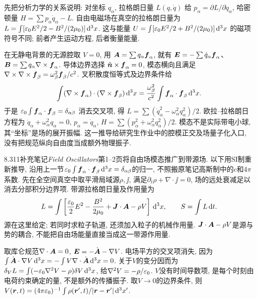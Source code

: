 先把分析力学的关系说明: 对坐标 $q_\alpha$, 拉格朗日量 $L(q,\dot q)$ 给 $p_\alpha=\partial L/\partial\dot q_\alpha$, 哈密顿量 $H=\sum p_\alpha\dot q_\alpha-L$. 自由电磁场在真空的拉格朗日量为
$L=\int[\varepsilon_0 E^2/2-B^2/(2\mu_0)]\,\mathrm d^3x$.
这与能量 $U=\int[\varepsilon_0 E^2/2+B^2/(2\mu_0)]\,\mathrm d^3x$ 的磁项符号不同; 前者产生运动方程, 后者衡量能量.

在无静电背景的无源腔取 $V=0$, 用 $\boldsymbol{A}=\sum q_\alpha\boldsymbol{f}_\alpha$, 就有 $\boldsymbol{E}=-\sum\dot q_\alpha\boldsymbol{f}_\alpha$、$\boldsymbol{B}=\sum q_\alpha\nabla\times\boldsymbol{f}_\alpha$. 导体边界选择 $\hat{\boldsymbol{n}}\times\boldsymbol{f}_\alpha=0$, 模态横向且满足 $\nabla\times\nabla\times\boldsymbol{f}_\beta=\omega_\beta^2\boldsymbol{f}_\beta/c^2$. 叉积散度恒等式及边界条件给
\[
 \int(\nabla\times\boldsymbol{f}_\alpha)\cdot(\nabla\times\boldsymbol{f}_\beta)\,\mathrm d^3x
 =\frac{\omega_\beta^2}{c^2}\int\boldsymbol{f}_\alpha\cdot\boldsymbol{f}_\beta\,\mathrm d^3x.
\]
于是 $\varepsilon_0\int\boldsymbol{f}_\alpha\cdot\boldsymbol{f}_\beta=\delta_{\alpha\beta}$ 消去交叉项, 得 $L=\sum(\dot q_\alpha^2-\omega_\alpha^2q_\alpha^2)/2$.
欧拉--拉格朗日方程为 $\ddot q_\alpha+\omega_\alpha^2q_\alpha=0$, $p_\alpha=\dot q_\alpha$, $H=\sum(p_\alpha^2+\omega_\alpha^2q_\alpha^2)/2$. 模态不是实际带电小球, 其“坐标”是场的展开振幅. 这一推导给研究生作业中的腔模正交及场量子化入口, 没有把规范纵向自由度当成额外物理振子.

8.311补充笔记\textit{Field Oscillators}第1--2页将自由场模态推广到带源场. 以下用SI制重新推导, 沿用上一节$\varepsilon_0\int\boldsymbol{f}_\alpha\cdot\boldsymbol{f}_\beta\,\mathrm d^3x=\delta_{\alpha\beta}$的归一, 不照搬原笔记高斯制中的$c$和$4\pi$系数. 先在全空间真空中取平滑局域源$\rho,\jj$, 满足$\partial_t\rho+\nabla\cdot\jj=0$, 场的远处衰减足以消去分部积分边界项. 带源拉格朗日量及作用量为
\[
L=\int\left[\frac{\varepsilon_0}{2}E^2-\frac{B^2}{2\mu_0}+\boldsymbol{J}\cdot\boldsymbol{A}-\rho V\right]\,\mathrm d^3x,
\qquad S=\int L\,\mathrm d t.
\]
源在这里给定; 若同时求粒子轨道, 还须加入粒子的机械作用量. $\boldsymbol{J}\cdot\boldsymbol{A}-\rho V$是源与势的耦合, 不能把自由场能量直接当成这一带源作用量.

取库仑规范$\nabla\cdot\boldsymbol{A}=0$, $\boldsymbol{E}=-\dot{\boldsymbol{A}}-\nabla V$. 电场平方的交叉项消失, 因为
$\int\dot{\boldsymbol{A}}\cdot\nabla V\,\mathrm d^3x=-\int V\nabla\cdot\dot{\boldsymbol{A}}\,\mathrm d^3x=0$.
关于$V$的变分因而为
$\delta_VL=\int(-\varepsilon_0\nabla^2V-\rho)\delta V\,\mathrm d^3x$,
给$\nabla^2V=-\rho/\varepsilon_0$. $V$没有时间导数项, 是每个时刻由电荷约束确定的量, 不是额外的传播振子. 取$V\to0$的边界条件, 则
$V(\boldsymbol{r},t)=(4\pi\varepsilon_0)^{-1}\int\rho(\boldsymbol{r}',t)/|\boldsymbol{r}-\boldsymbol{r}'|\,\mathrm d^3x'$.

